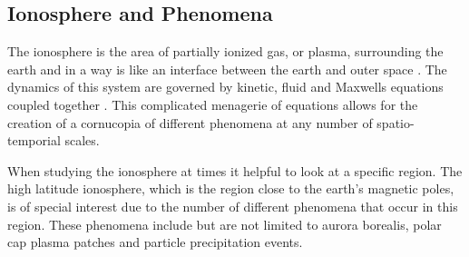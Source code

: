 \subsection{Ionosphere and Phenomena}
The ionosphere is the area of partially ionized gas, or plasma, surrounding the earth and in a way is like an interface between the earth and outer space \cite{kellybook}. The dynamics of this system are governed by kinetic, fluid and Maxwells equations coupled together \cite{schunk2004ionospheres}. This complicated menagerie of equations allows for the creation of a cornucopia of different phenomena at any number of spatio-temporial scales.


%
% 
%

When studying the ionosphere at times it helpful to look at a specific region. The high latitude ionosphere, which is the region close to the earth's magnetic poles, is of special interest due to the number of different phenomena that occur in this region. These phenomena include but are not limited to aurora borealis, polar cap plasma patches and particle precipitation events. 

